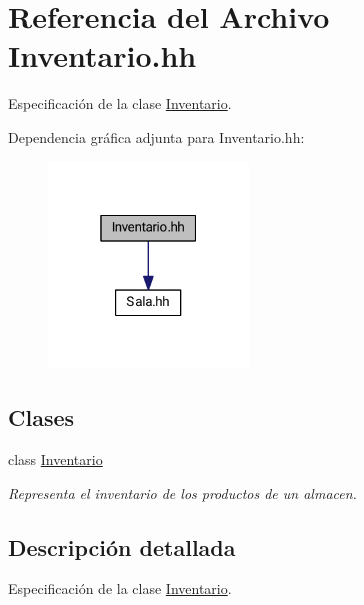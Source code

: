 \hypertarget{_inventario_8hh}{}\section{Referencia del Archivo Inventario.\+hh}
\label{_inventario_8hh}


Especificación de la clase \hyperlink{class_inventario}{Inventario}.  


Dependencia gráfica adjunta para Inventario.\+hh\+:
\nopagebreak
\begin{figure}[H]
\begin{center}
\leavevmode
\includegraphics[width=151pt]{_inventario_8hh__incl}
\end{center}
\end{figure}
\subsection*{Clases}
\begin{DoxyCompactItemize}
\item 
class \hyperlink{class_inventario}{Inventario}
\begin{DoxyCompactList}\small\item\em Representa el inventario de los productos de un almacen. \end{DoxyCompactList}\end{DoxyCompactItemize}


\subsection{Descripción detallada}
Especificación de la clase \hyperlink{class_inventario}{Inventario}. 

